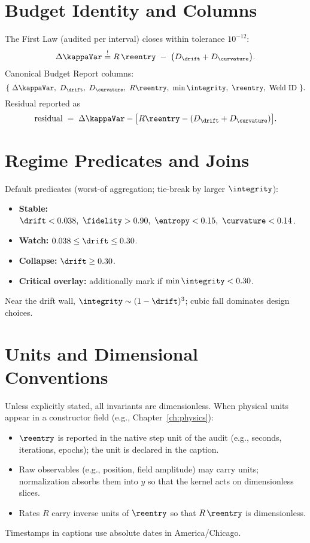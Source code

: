 \section{Budget Identity and Columns}
\label{apx:budget}
The First Law (audited per interval) closes within tolerance \(10^{-12}\):
\[
  \Delta \kappaVar \stackrel{!}{=} R\,\reentry \;-\; \bigl(D_{\drift}+D_{\curvature}\bigr).
\]
Canonical Budget Report columns:
\[
\{\ \Delta\kappaVar,\ D_{\drift},\ D_{\curvature},\ R\reentry,\ \min\integrity,\ \reentry,\ \text{Weld ID}\ \}.
\]
Residual reported as
\[
\text{residual} \;=\; \Delta \kappaVar - \bigl[R\reentry-(D_{\drift}+D_{\curvature})\bigr].
\]

\section{Regime Predicates and Joins}
\label{apx:regimes}
Default predicates (worst-of aggregation; tie-break by larger \(\integrity\)):
\begin{itemize}[leftmargin=1.25em]
  \item \textbf{Stable:} \(\drift<0.038,\ \fidelity>0.90,\ \entropy<0.15,\ \curvature<0.14\).
  \item \textbf{Watch:} \(0.038\le \drift \le 0.30\).
  \item \textbf{Collapse:} \(\drift\ge 0.30\).
  \item \textbf{Critical overlay:} additionally mark if \(\min\integrity<0.30\).
\end{itemize}
Near the drift wall, \(\integrity\sim(1-\drift)^3\); cubic fall dominates design choices.

\section{Units and Dimensional Conventions}
\label{apx:units}
Unless explicitly stated, all invariants are dimensionless. When physical units appear in a constructor field (e.g., Chapter~\ref{ch:physics}):
\begin{itemize}[leftmargin=1.25em]
  \item \(\reentry\) is reported in the native step unit of the audit (e.g., seconds, iterations, epochs); the unit is declared in the caption.
  \item Raw observables (e.g., position, field amplitude) may carry units; normalization absorbs them into \(y\) so that the kernel acts on dimensionless slices.
  \item Rates \(R\) carry inverse units of \(\reentry\) so that \(R\,\reentry\) is dimensionless.
\end{itemize}
Timestamps in captions use absolute dates in America/Chicago.

